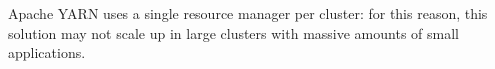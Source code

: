 Apache YARN \cite{yarn} uses a single resource manager per cluster: for this reason, this solution may not scale up in large clusters with massive amounts of small applications.